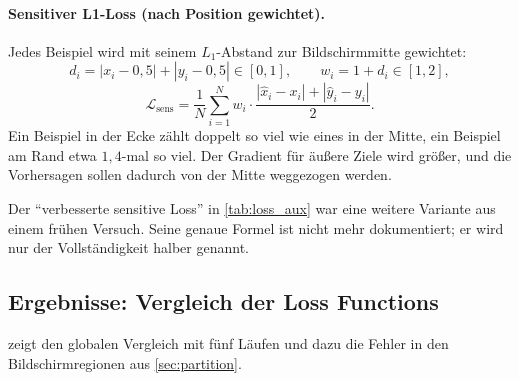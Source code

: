 \paragraph{Sensitiver L1-Loss (nach Position gewichtet).}
Jedes Beispiel wird mit seinem $L_1$-Abstand zur Bildschirmmitte gewichtet:
\begin{equation}
  d_i = |x_i-0,5| + |y_i-0,5| \in [0,1],\qquad
  w_i = 1 + d_i \in [1,2],
\end{equation}
\begin{equation}
  \mathcal{L}_{\mathrm{sens}} = \frac{1}{N}\sum_{i=1}^{N}
  w_i\cdot\frac{|\hat x_i-x_i| + |\hat y_i-y_i|}{2}.
\end{equation}
Ein Beispiel in der Ecke zählt doppelt so viel wie eines in der Mitte, ein
Beispiel am Rand etwa $1,4$-mal so viel. Der Gradient für äußere Ziele wird
größer, und die Vorhersagen sollen dadurch von der Mitte weggezogen werden.

Der \enquote{verbesserte sensitive Loss} in \cref{tab:loss_aux} war eine
weitere Variante aus einem frühen Versuch. Seine genaue Formel ist nicht mehr
dokumentiert; er wird nur der Vollständigkeit halber genannt.

\subsection{Ergebnisse: Vergleich der Loss Functions}
\label{sec:loss_results}

 zeigt den globalen Vergleich mit fünf Läufen und dazu die
Fehler in den Bildschirmregionen aus \cref{sec:partition}.

